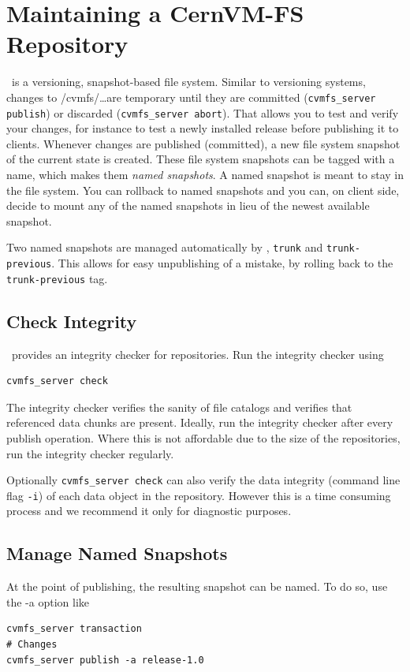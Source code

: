 \section{Maintaining a CernVM-FS Repository}

\cvmfs\ is a versioning, snapshot-based file system. 
Similar to versioning systems, changes to /cvmfs/\dots are temporary until they are committed (\texttt{cvmfs\_server publish}) or discarded (\texttt{cvmfs\_server abort}). 
That allows you to test and verify your changes, for instance to test a newly installed release before publishing it to clients.
Whenever changes are published (committed), a new file system snapshot of the current state is created. 
These file system snapshots can be tagged with a name, which makes them \emph{named snapshots}. 
A named snapshot is meant to stay in the file system. 
You can rollback to named snapshots and you can, on client side, decide to mount any of the named snapshots in lieu of the newest available snapshot.

Two named snapshots are managed automatically by \cvmfs, \texttt{trunk} and \texttt{trunk-previous}. 
This allows for easy unpublishing of a mistake, by rolling back to the \texttt{trunk-previous} tag.

\subsection{Check Integrity}
\cvmfs\ provides an integrity checker for repositories.
Run the integrity checker using
\begin{verbatim}
cvmfs_server check
\end{verbatim}

The integrity checker verifies the sanity of file catalogs and verifies that referenced data chunks are present.
Ideally, run the integrity checker after every publish operation.
Where this is not affordable due to the size of the repositories, run the integrity checker regularly.

Optionally \texttt{cvmfs\_server check} can also verify the data integrity (command line flag \texttt{-i}) of each data object in the repository.
However this is a time consuming process and we recommend it only for diagnostic purposes.

\subsection{Manage Named Snapshots}

At the point of publishing, the resulting snapshot can be named. 
To do so, use the -a option like
\begin{verbatim}
cvmfs_server transaction
# Changes
cvmfs_server publish -a release-1.0
\end{verbatim}

